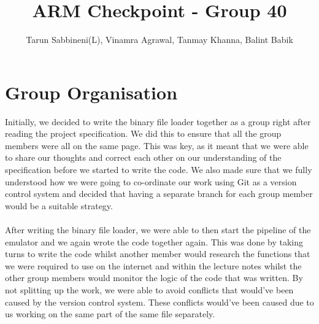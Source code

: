 \documentclass[11pt]{article}
\begin{document}
\title{ARM Checkpoint - Group 40}
\author{Tarun Sabbineni(L), Vinamra Agrawal, Tanmay Khanna, Balint Babik}

\maketitle

\begin{comment}
On or before the 27th of May, you should submit to CATe a 1 page (2 A4-sides maximum) summary that outlines your your group working and implementation of the emulator. The report should include:

• A statement on how you’ve split the work between group members and how you are co-ordinating your work.

• A discussion on how well you think the group is working and how you imagine it might need to change for the later tasks.

• How you’ve structured your emulator, and what bits you think you will be able to reuse for the assembler.

• A discussion on implementation tasks that you think you will ﬁnd difficult / challenging later on, and how you are working to mitigate these.
\end{comment}


\section{Group Organisation}

Initially, we decided to write the binary file loader together as a group right after reading the project specification. We did this to ensure that all the group members were all on the same page. This was key, as it meant that we were able to share our thoughts and correct each other on our understanding of the specification before we started to write the code. We also made sure that we fully understood how we were going to co-ordinate our work using Git as a version control system and decided that having a separate branch for each group member would be a suitable strategy. 
\paragraph{}
After writing the binary file loader, we were able to then start the pipeline of the emulator and we again wrote the code together again. This was done by taking turns to write the code whilst another member would research the functions that we were required to use on the internet and within the lecture notes whilst the other group members would monitor the logic of the code that was written. By not splitting up the work, we were able to avoid conflicts that would've been caused by the version control system. These conflicts would've been caused due to us working on the same part of the same file separately. 
\end{document}
